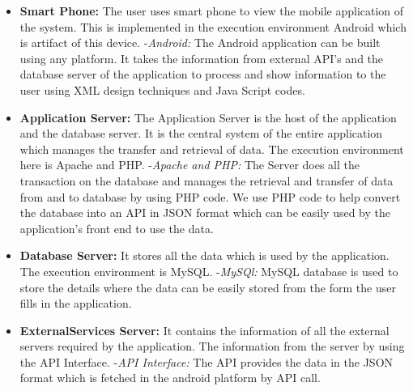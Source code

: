 \begin{itemize}
\item \textbf{Smart Phone:} The user uses smart phone to view the mobile application of the system. This is implemented in the execution environment Android which is artifact of this device.\newline
-\textit{Android:} The Android application can be built using any platform. It takes the information from external API's and the database server of the application to process and show information to the user using XML design techniques and Java Script codes.
\item \textbf{Application Server:} The Application Server is the host of the application and the database server. It is the central system of the entire application which manages the transfer and retrieval of data. The execution environment here is Apache and PHP.\newline
-\textit{Apache and PHP: } The Server does all the transaction on the database and manages the retrieval and transfer of data from and to database by using PHP code. We use PHP code to help convert the database into an API in JSON format which can be easily used by the application's front end to use the data.
\item \textbf{Database Server:} It stores all the data which is used by the application. The execution environment is MySQL.\newline
-\textit{MySQl:} MySQL database is used to store the details where the data can be easily stored from the form the user fills in the application. 
\item \textbf{ExternalServices Server:} It contains the information of all the external servers required by the application. The information from the server by using the API Interface.\newline
-\textit{API Interface:} The API provides the data in the JSON format which is fetched in the android platform by API call. 


\end{itemize}

